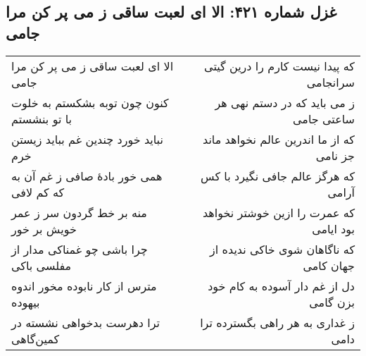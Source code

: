 \begin{center}
\section*{غزل شماره ۴۲۱: الا ای لعبت ساقی ز می پر کن مرا جامی}
\label{sec:421}
\begin{longtable}{l p{0.5cm} r}
الا ای لعبت ساقی ز می پر کن مرا جامی
&&
که پیدا نیست کارم را درین گیتی سرانجامی
\\
کنون چون توبه بشکستم به خلوت با تو بنشستم
&&
ز می باید که در دستم نهی هر ساعتی جامی
\\
نباید خورد چندین غم بباید زیستن خرم
&&
که از ما اندرین عالم نخواهد ماند جز نامی
\\
همی خور بادهٔ صافی ز غم آن به که کم لافی
&&
که هرگز عالم جافی نگیرد با کس آرامی
\\
منه بر خط گردون سر ز عمر خویش بر خور
&&
که عمرت را ازین خوشتر نخواهد بود ایامی
\\
چرا باشی چو غمناکی مدار از مفلسی باکی
&&
که ناگاهان شوی خاکی ندیده از جهان کامی
\\
مترس از کار نابوده مخور اندوه بیهوده
&&
دل از غم دار آسوده به کام خود بزن گامی
\\
ترا دهرست بدخواهی نشسته در کمین‌گاهی
&&
ز غداری به هر راهی بگسترده ترا دامی
\\
\end{longtable}
\end{center}
